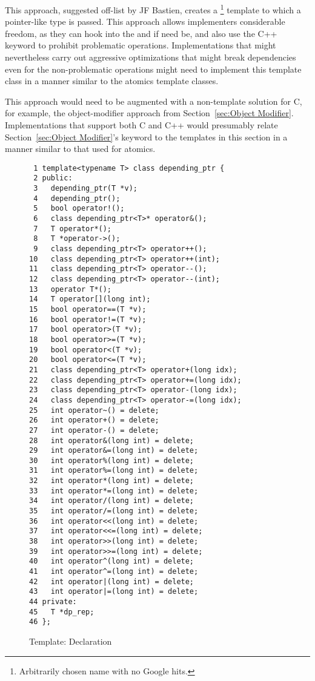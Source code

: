 This approach, suggested off-list by JF Bastien, creates a
\footnote{
	Arbitrarily chosen name with no Google hits.}
template to which a pointer-like type is passed.
This approach allows implementers considerable freedom, as they can
hook into the \co{->} and \co{*} if need be, and also use the C++
 keyword to prohibit problematic operations.
Implementations that might nevertheless carry out aggressive
optimizations that might break dependencies even for the non-problematic
operations might need to implement this template class in a manner
similar to the atomics template classes.

This approach would need to be augmented with a non-template solution
for C, for example, the object-modifier approach from
Section~\ref{sec:Object Modifier}.
Implementations that support both C and C++ would presumably relate
Section~\ref{sec:Object Modifier}'s
keyword to the templates in this section in a manner similar to
that used for atomics.

\begin{figure}[tbp]
{ \scriptsize
\begin{verbatim}
 1 template<typename T> class depending_ptr {
 2 public:
 3   depending_ptr(T *v);
 4   depending_ptr();
 5   bool operator!();
 6   class depending_ptr<T>* operator&();
 7   T operator*();
 8   T *operator->();
 9   class depending_ptr<T> operator++();
10   class depending_ptr<T> operator++(int);
11   class depending_ptr<T> operator--();
12   class depending_ptr<T> operator--(int);
13   operator T*();
14   T operator[](long int);
15   bool operator==(T *v);
16   bool operator!=(T *v);
17   bool operator>(T *v);
18   bool operator>=(T *v);
19   bool operator<(T *v);
20   bool operator<=(T *v);
21   class depending_ptr<T> operator+(long idx);
22   class depending_ptr<T> operator+=(long idx);
23   class depending_ptr<T> operator-(long idx);
24   class depending_ptr<T> operator-=(long idx);
25   int operator~() = delete;
26   int operator+() = delete;
27   int operator-() = delete;
28   int operator&(long int) = delete;
29   int operator&=(long int) = delete;
30   int operator%(long int) = delete;
31   int operator%=(long int) = delete;
32   int operator*(long int) = delete;
33   int operator*=(long int) = delete;
34   int operator/(long int) = delete;
35   int operator/=(long int) = delete;
36   int operator<<(long int) = delete;
37   int operator<<=(long int) = delete;
38   int operator>>(long int) = delete;
39   int operator>>=(long int) = delete;
40   int operator^(long int) = delete;
41   int operator^=(long int) = delete;
42   int operator|(long int) = delete;
43   int operator|=(long int) = delete;
44 private:
45   T *dp_rep;
46 };
\end{verbatim}
}
\caption{Template: Declaration}
\label{fig:Template: Declaration}
\end{figure}

